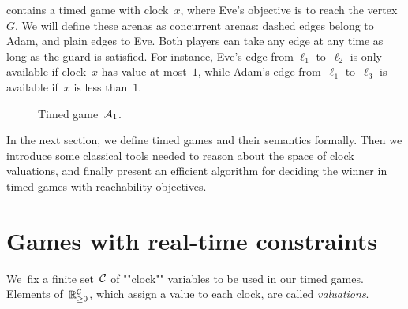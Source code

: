 \begin{example}\label{10-ex:intro}
 contains a timed game with clock~$x$, where Eve's objective is to reach the vertex~$G$.
We will define these arenas as concurrent arenas: dashed edges belong to Adam,
and plain edges to Eve. Both players can take any edge at any time as long as
the guard is satisfied. For instance, Eve's edge from $\ell_1$ to~$\ell_2$ is only available if clock~$x$ has value at most~$1$, while Adam's edge from~$\ell_1$ to~$\ell_3$ is available if~$x$ is less than~$1$. 

\begin{figure}[ht]
  \centering
  \caption{Timed game~$\mathcal{A}_1$.}
  \label{10-fig:ta1}
\end{figure}
\end{example}

In the next section, we define timed games and their semantics formally.
Then we introduce some classical tools needed to reason
about the space of clock valuations, and finally present an efficient
algorithm for deciding the winner in timed games with reachability
objectives.

\section{Games with real-time constraints}
We~fix a finite set~$\mathcal{C}$ of ""clock"" variables to be used
in our timed games. Elements of~$\mathbb{R}_{\geq 0}^{\mathcal{C}}$, which assign a
value to each clock, are called \emph{valuations}.

